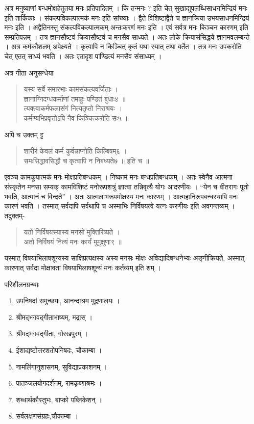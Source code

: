 अत्र मनुष्याणां बन्धमोक्षहेतुतया मनः प्रतिपादितम् । किं तन्मनः ? इति चेत्  सुखाद्युपलब्धिसाधनमिन्द्रियं मनः इति तार्किकाः । संकल्पविकल्पात्मकं मनः इति सांख्याः । द्वैते विशिष्टाद्वैते च ज्ञानक्रिया उभयसाधनमिन्द्रियं मनः इति । अद्वैतिनस्तु संकल्पविकल्पात्मकम् अन्तःकरणं मनः इति । एवं सर्वत्र मनः किञ्चन कारणम् इति सम्प्रतिपन्नम् । तत्र ज्ञानसौष्टवं क्रियासौष्टवं च मनसैव साध्यते । अतः लोके क्रियासंसिद्धये ज्ञानमवलम्बन्ते । अत्र कर्मकौशलम् अपेक्ष्यते । कृत्वापि न किञ्चित् कृतं यथा स्यात् तथा वर्तेत । तत्र मनः उपकरोति चेत् एतत् साध्यं भवति । अतः एतादृश पाण्डित्यं मनसैव संसाध्यम् । 

अत्र गीता अनुसन्धेया 	
\begin{verse}
यस्य सर्वे समारभाः कामसंकल्पवर्जिताः ।\\
ज्ञानाग्निदग्धकर्माणां तमाहुः पण्डितं बुधाः४ ॥\\
त्यक्त्वाकर्मफलासंगं नित्यतृप्तो निराश्रयः ।\\
कर्मण्यभिप्रवृत्तोऽपि नैव किञ्चित्करोति सः५ ॥
\end{verse}
अपि च उक्तम् ट्ट
\begin{verse}
शारीरं केवलं कर्म कुर्वन्नाप्नोति किल्बिषम्६ ।\\
समःसिद्धावसिद्धौ च कृत्वापि न निबध्यते७ ॥ इति च ॥
\end{verse}
एवञ्च कामकूपात्मकं मनः मोक्षप्रतिबन्धकम् । निष्कामं मनः बन्धप्रतिबन्धकम् । अतः स्वेनैव आत्मना संस्कृतेन मनसा सम्यक् कामविशिष्टं मनोरूपशत्रुं ज्ञात्वा तन्निवृत्यै योगः आदरणीयः । “येन च वीतरागः पूतो भवति, आत्मानं च विन्दते” । अतः आत्मलाभरूपमोक्षस्य मनः कारणम् । आत्महानिरूपबन्धस्यापि मनः कारणं भवति । तस्मात् सर्वदापि सर्वथापि च अस्माभिः निर्विषयत्वे यत्नः करणीयः इति अवगन्तव्यम् । तदुक्तम्- 
\begin{verse}
यतो निर्विषयस्यास्य मनसो मुक्तिरिष्यते ।\\
अतो निर्विषयं नित्यं मनः कार्यं मुमुक्षुणा९ ॥
\end{verse}

यस्मात् विषयाभिलाषशून्यस्य साक्षिप्रत्यक्षस्य अस्य मनसः मोक्षः अविद्यादिबन्धनेभ्यः अङ्गीक्रियते, अस्मात् कारणात् सर्वदा मोक्षावता विषयाभिलाषशून्यं मनः कर्तव्यम् इति शम् ।  

परिशीलनग्रन्थाः 
\begin{enumerate}
\item उपनिषदां समुच्छयः, आनन्दाश्रम मुद्रणालयः । 
\item श्रीमद्भगवद्गीताभाष्यम्, मद्रास् ।
\item श्रीमद्भगवद्गीता, गोरखपुरम् ।
\item ईशाद्यष्टोत्तरशतोपनिषदः, चौकाम्बा । 
\item नामलिंगानुशासनम्, सुविद्याप्रकाशनम् ।
\item पातञ्जलयोगदर्शनम्, रामकृष्णाश्रमः ।
\item शब्धार्थकौस्तुभः, बाप्को पब्लिकेशन् ।
\item सर्वलक्षणसंग्रहः,चौकाम्बा ।
\end{enumerate}

